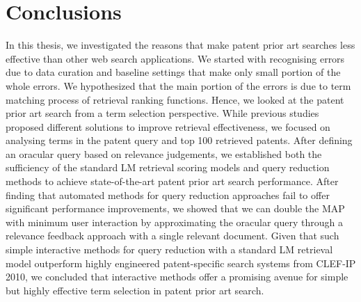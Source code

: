 \chapter{Conclusions}
\label{cha:conc}


In this thesis, we investigated the reasons that make patent prior art searches 
less effective than other web search applications.
We started with recognising errors due to data curation and baseline settings that 
make only small portion of the whole errors. We hypothesized that the main portion of the errors is 
due to term matching process of retrieval ranking functions. 
Hence, we looked at the patent prior art search from
a term selection perspective. While previous studies proposed
different solutions to improve retrieval effectiveness, we 
focused on analysing terms in the patent query and top 100 retrieved patents. 
After defining an oracular query based on
relevance judgements, we established both the sufficiency
of the standard LM retrieval scoring models and query reduction 
methods to achieve state-of-the-art patent prior art
search performance. After finding that automated methods 
for query reduction approaches fail to offer significant
performance improvements, we showed that we can double
the MAP with minimum user interaction by approximating
the oracular query through a relevance feedback approach
with a single relevant document. Given that such simple 
interactive methods for query reduction with a standard LM
retrieval model outperform highly engineered patent-specific
search systems from CLEF-IP 2010, we concluded that interactive 
methods offer a promising avenue for simple but
highly effective term selection in patent prior art search.
 

